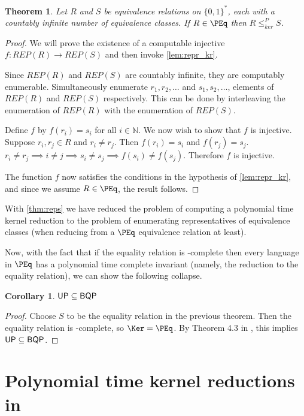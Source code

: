 \documentclass{article}
\newtheorem{theorem}{Theorem}[section]
\newtheorem{corollary}[corollary]{Corollary}
\theoremstyle{definition} \newtheorem{definition}[definition]{Definition}
\newcommand{\sigmastar}{\{0, 1\}^{*}} %
\newcommand{\kr}{\leq^{P}_{ker}} %
\begin{document}
\begin{theorem}\label{thm:reps}
  Let $R$ and $S$ be equivalence relations on $\sigmastar$, each with a countably infinite number of equivalence classes.
  If $R\in\PEq$ then $R\kr S$.
\end{theorem}
\begin{proof}
  We will prove the existence of a computable injective $f\colon REP(R)\to REP(S)$ and then invoke \autoref{lem:repr_kr}.

  Since $REP(R)$ and $REP(S)$ are countably infinite, they are computably enumerable.
  Simultaneously enumerate $r_1, r_2, \ldots$ and $s_1, s_2, \ldots$, elements of $REP(R)$ and $REP(S)$ respectively.
  This can be done by interleaving the enumeration of $REP(R)$ with the enumeration of $REP(S)$.

  Define $f$ by $f(r_i)=s_i$ for all $i\in\mathbb{N}$.
  We now wish to show that $f$ is injective.
  Suppose $r_i,r_j\in R$ and $r_i\neq r_j$.
  Then $f(r_i)=s_i$ and $f(r_j)=s_j$. $r_i\neq r_j\implies i\neq j\implies s_i\neq s_j\implies f(s_i)\neq f(s_j)$.
  Therefore $f$ is injective.

  The function $f$ now satisfies the conditions in the hypothesis of \autoref{lem:repr_kr}, and since we assume $R\in\PEq$, the result follows.
\end{proof}

With \autoref{thm:reps} we have reduced the problem of computing a polynomial time kernel reduction to the problem of enumerating representatives of equivalence classes (when reducing from a $\PEq$ equivalence relation at least).

Now, with the fact that if the equality relation is \PEq-complete then every language in $\PEq$ has a polynomial time complete invariant (namely, the reduction to the equality relation), we can show the following collapse.

\begin{corollary}
  ${\mathsf{UP}}\subseteq{\ensuremath{\mathsf{BQP}}}$
\end{corollary}
\begin{proof}
  Choose $S$ to be the equality relation in the previous theorem.
  Then the equality relation is \PEq-complete, so $\Ker=\PEq$.
  By Theorem 4.3 in \cite{fg11}, this implies ${\mathsf{UP}}\subseteq{\ensuremath{\mathsf{BQP}}}$.
\end{proof}

\section{Polynomial time kernel reductions in \texorpdfstring{\NPEq}{NPEq}}
\end{document}
